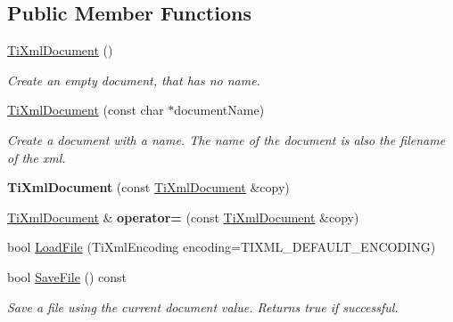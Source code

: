 \subsection*{Public Member Functions}
\begin{DoxyCompactItemize}
\item 
\mbox{\label{classTiXmlDocument_a9f5e84335708fde98400230f9f12659c}} 
\hyperlink{classTiXmlDocument_a9f5e84335708fde98400230f9f12659c}{Ti\+Xml\+Document} ()
\begin{DoxyCompactList}\small\item\em Create an empty document, that has no name. \end{DoxyCompactList}\item 
\mbox{\label{classTiXmlDocument_ae4508b452d0c3061db085f3db27b8396}} 
\hyperlink{classTiXmlDocument_ae4508b452d0c3061db085f3db27b8396}{Ti\+Xml\+Document} (const char $\ast$document\+Name)
\begin{DoxyCompactList}\small\item\em Create a document with a name. The name of the document is also the filename of the xml. \end{DoxyCompactList}\item 
\mbox{\label{classTiXmlDocument_a323a7486e7da6099cdc19a5ff7e74b07}} 
{\bfseries Ti\+Xml\+Document} (const \hyperlink{classTiXmlDocument}{Ti\+Xml\+Document} \&copy)
\item 
\mbox{\label{classTiXmlDocument_aa56fd4dbe8917d2033d865909e2d737e}} 
\hyperlink{classTiXmlDocument}{Ti\+Xml\+Document} \& {\bfseries operator=} (const \hyperlink{classTiXmlDocument}{Ti\+Xml\+Document} \&copy)
\item 
bool \hyperlink{classTiXmlDocument_a4c852a889c02cf251117fd1d9fe1845f}{Load\+File} (Ti\+Xml\+Encoding encoding=T\+I\+X\+M\+L\+\_\+\+D\+E\+F\+A\+U\+L\+T\+\_\+\+E\+N\+C\+O\+D\+I\+NG)
\item 
\mbox{\label{classTiXmlDocument_ab63b96a6af5a467e289c7c75202edad9}} 
bool \hyperlink{classTiXmlDocument_ab63b96a6af5a467e289c7c75202edad9}{Save\+File} () const
\begin{DoxyCompactList}\small\item\em Save a file using the current document value. Returns true if successful. \end{DoxyCompactList}\item 

\end{DoxyCompactItemize}
